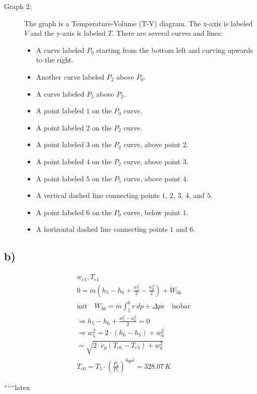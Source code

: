 \begin{description}
    \item[Graph 2:] The graph is a Temperature-Volume (T-V) diagram. The x-axis is labeled $V$ and the y-axis is labeled $T$. There are several curves and lines:
    \begin{itemize}
        \item A curve labeled $P_0$ starting from the bottom left and curving upwards to the right.
        \item Another curve labeled $P_2$ above $P_0$.
        \item A curve labeled $P_5$ above $P_2$.
        \item A point labeled $1$ on the $P_0$ curve.
        \item A point labeled $2$ on the $P_2$ curve.
        \item A point labeled $3$ on the $P_2$ curve, above point $2$.
        \item A point labeled $4$ on the $P_2$ curve, above point $3$.
        \item A point labeled $5$ on the $P_5$ curve, above point $4$.
        \item A vertical dashed line connecting points $1$, $2$, $3$, $4$, and $5$.
        \item A point labeled $6$ on the $P_0$ curve, below point $1$.
        \item A horizontal dashed line connecting points $1$ and $6$.
    \end{itemize}
\end{description}

\subsection*{b)}

\begin{align*}
    & w_{e1}, T_{e1} \\
    & 0 = \dot{m} (h_5 - h_6 + \frac{w_5^2}{2} - \frac{w_6^2}{2}) + \dot{W}_{56} \\
    & \text{mit} \quad \dot{W}_{56} = \dot{m} \int_{5}^{6} v \, dp + \Delta pe \quad \text{isobar} \\
    & \Rightarrow h_5 - h_6 + \frac{w_5^2 - w_6^2}{2} = 0 \\
    & \Rightarrow w_5^2 = 2 \cdot (h_6 - h_5) + w_6^2 \\
    & = \sqrt{2 \cdot c_p (T_{e6} - T_{e5}) + w_6^2} \\
    & T_{e6} = T_5 \cdot \left( \frac{P_6}{P_5} \right)^{\frac{n-1}{n}} = 328.07 \, K
\end{align*}

``````latex


